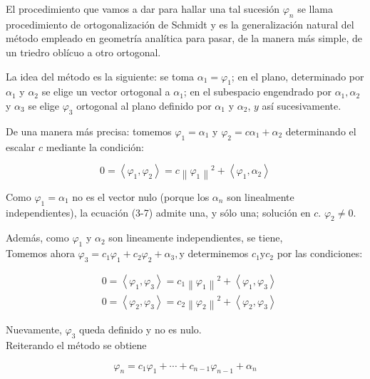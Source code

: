 \documentclass[10pt]{article}
\theoremstyle{plain}
\theoremstyle{definition}
\theoremstyle{remark}
\begin{document}
El procedimiento que vamos a dar para hallar una tal sucesión $\varphi_{n}$ se llama procedimiento de ortogonalización de Schmidt y es la generalización natural del método empleado en geometría analítica para pasar, de la manera más simple, de un triedro oblícuo a otro ortogonal.

La idea del método es la siguiente: se toma $\alpha_{1}=\varphi_{1}$; en el plano, determinado por $\alpha_{1}$ y $\alpha_{2}$ se elige un vector ortogonal a $\alpha_{1}$; en el subespacio engendrado por $\alpha_{1}, \alpha_{2}$ y $\alpha_{3}$ se elige $\varphi_{3}$ ortogonal al plano definido por $\alpha_{1}$ y $\alpha_{2}$, $y$ así sucesivamente.

De una manera más precisa: tomemos $\varphi_{1}=\alpha_{1}$ y $\varphi_{2}=c \alpha_{1}+\alpha_{2}$ determinando el escalar $c$ mediante la condición:


\begin{equation*}
0=\left\langle\varphi_{1}, \varphi_{2}\right\rangle=c\left\|\varphi_{1}\right\|^{2}+\left\langle\varphi_{1}, \alpha_{2}\right\rangle \tag{3-7}
\end{equation*}


Como $\varphi_{1}=\alpha_{1}$ no es el vector nulo (porque los $\alpha_{n}$ son linealmente independientes), la ecuación (3-7) admite una, y sólo una; solución en $c$. $\varphi_{2} \neq 0$.

Además, como $\varphi_{1}$ y $\alpha_{2}$ son lineamente independientes, se tiene,\\
Tomemos ahora $\varphi_{3}=c_{1} \varphi_{1}+c_{2} \varphi_{2}+\alpha_{3}, \mathrm{y}$ determinemos $c_{1} \mathrm{y} c_{2}$ por las condiciones:

$$
\begin{aligned}
& 0=\left\langle\varphi_{1}, \varphi_{3}\right\rangle=c_{1}\left\|\varphi_{1}\right\|^{2}+\left\langle\varphi_{1}, \varphi_{3}\right\rangle \\
& 0=\left\langle\varphi_{2}, \varphi_{3}\right\rangle=c_{2}\left\|\varphi_{2}\right\|^{2}+\left\langle\varphi_{2}, \varphi_{3}\right\rangle
\end{aligned}
$$

Nuevamente, $\varphi_{3}$ queda definido y no es nulo.\\
Reiterando el método se obtiene


\begin{equation*}
\varphi_{n}=c_{1} \varphi_{1}+\cdots+c_{n-1} \varphi_{n-1}+\alpha_{n} \tag{3.8}
\end{equation*}
\end{document}
